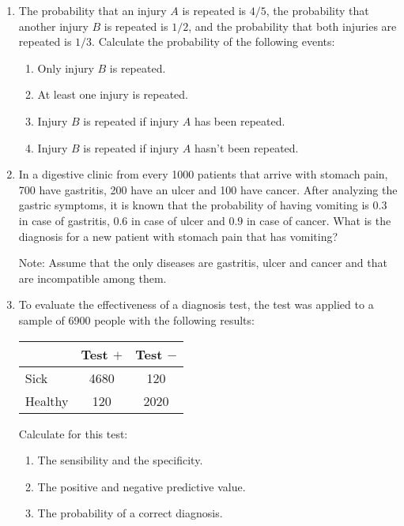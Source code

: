 \begin{enumerate}[leftmargin=*,resume]
\item The probability that an injury $A$ is repeated is $4/5$, the probability that another injury $B$ is repeated is
$1/2$, and the probability that both injuries are repeated is $1/3$.
Calculate the probability of the following events:
\begin{enumerate}
\item Only injury $B$ is repeated.
\item At least one injury is repeated.
\item Injury $B$ is repeated if injury $A$ has been repeated.
\item Injury $B$ is repeated if injury $A$ hasn't been repeated. 
\end{enumerate}

\item In a digestive clinic from every 1000 patients that arrive with stomach pain, 700 have gastritis,
200 have an ulcer and 100 have cancer.
After analyzing the gastric symptoms, it is known that the probability of having vomiting is $0.3$ in case of gastritis,
$0.6$ in case of ulcer and $0.9$ in case of cancer. 
What is the diagnosis for a new patient with stomach pain that has vomiting?

Note: Assume that the only diseases are gastritis, ulcer and cancer and that are incompatible among them.  

\item To evaluate the effectiveness of a diagnosis test, the test was applied to a sample of 6900 people with the
following results:

\begin{center}
\begin{tabular}{|l|c|c|}
\cline{2-3}
\multicolumn{1}{l|}{} & Test $+$ & Test $-$ \\
\hline
Sick & 4680 & 120 \\
\hline
Healthy & 120 & 2020 \\
\hline
\end{tabular}
\end{center}

Calculate for this test:
\begin{enumerate}
\item The sensibility and the specificity.
\item The positive and negative predictive value.
\item The probability of a correct diagnosis. 
\end{enumerate}


\end{enumerate}

